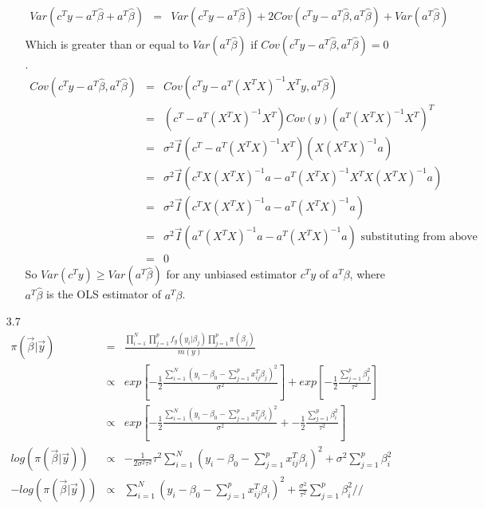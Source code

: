 \documentclass{article}
\begin{document}
\begin{enumerate}
\begin{enumerate}
\begin{eqnarray*}
        Var(c^Ty - a^T\hat\beta + a^T\hat\beta) &=& Var(c^Ty - a^T\hat\beta) + 2Cov(c^Ty - a^T\hat\beta,a^T\hat\beta) + Var(a^T\hat\beta) \\        
      \end{eqnarray*}
      Which is greater than or equal to $Var(a^T\hat\beta)$ if $Cov(c^Ty - a^T\hat\beta,a^T\hat\beta) = 0$.
      \begin{eqnarray*}
        Cov(c^Ty - a^T\hat\beta,a^T\hat\beta) &=& Cov(c^Ty-a^T(X^TX)^{-1}X^Ty,a^T\hat\beta) \\
                                              &=& (c^T-a^T(X^TX)^{-1}X^T)Cov(y)(a^T(X^TX)^{-1}X^T)^T \\
                                              &=& \sigma^2\vec{I}(c^T-a^T(X^TX)^{-1}X^T)(X(X^TX)^{-1}a) \\
                                              &=& \sigma^2\vec{I}(c^TX(X^TX)^{-1}a - a^T(X^TX)^{-1}X^TX(X^TX)^{-1}a) \\
                                              &=& \sigma^2\vec{I}(c^TX(X^TX)^{-1}a - a^T(X^TX)^{-1}a) \\
                                              &=& \sigma^2\vec{I}(a^T(X^TX)^{-1}a - a^T(X^TX)^{-1}a) \text{ substituting from above} \\
                                              &=& 0
      \end{eqnarray*}
      So $Var(c^Ty) \ge Var(a^T\hat\beta)$ for any unbiased estimator $c^Ty$ of $a^T\beta$, where $a^T\hat\beta$ is the OLS estimator of $a^T\beta$. 
    \end{enumerate}
    \item[3.7]
      \begin{eqnarray*}
        \pi(\vec{\beta}|\vec{y}) &=& \frac{\prod_{i=1}^N\prod_{j=1}^p f_y(y_i|\beta_j)\prod_{j=1}^p\pi(\beta_j)}{m(y)} \\
                                 &\propto& exp\left[-\frac{1}{2}\frac{\sum_{i=1}^N(y_i - \beta_0 - \sum_{j=1}^px_{ij}^T\beta_j)^2}{\sigma^2}\right]
                                        + exp\left[-\frac{1}{2}\frac{\sum_{j=1}^p\beta_j^2}{\tau^2}\right] \\
                                 &\propto& exp\left[-\frac{1}{2}\frac{\sum_{i=1}^N(y_i - \beta_0 - \sum_{j=1}^px_{ij}^T\beta_i)^2}{\sigma^2} 
                                        + -\frac{1}{2}\frac{\sum_{j=1}^p\beta_i^2}{\tau^2}\right] \\
   log(\pi(\vec{\beta}|\vec{y})) &\propto& -\frac{1}{2\sigma^2\tau^2}\tau^2\sum_{i=1}^{N}(y_i - \beta_0 - \sum_{j=1}^px_{ij}^T\beta_i)^2 + \sigma^2\sum_{j=1}^p\beta_i^2 \\
  -log(\pi(\vec{\beta}|\vec{y})) &\propto& \sum_{i=1}^{N}(y_i - \beta_0 - \sum_{j=1}^px_{ij}^T\beta_i)^2 + \frac{\sigma^2}{\tau^2}\sum_{j=1}^p\beta_i^2 //\\
      \end{eqnarray*}
\end{enumerate}
\end{document}
